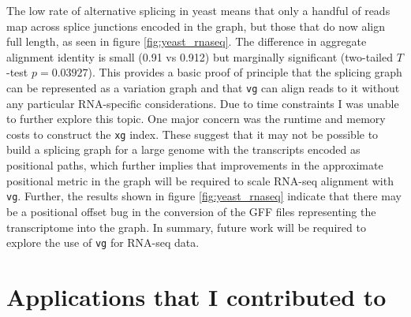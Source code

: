 The low rate of alternative splicing in yeast means that only a handful of reads map across splice junctions encoded in the graph, but those that do now align full length, as seen in figure \ref{fig:yeast_rnaseq}.
The difference in aggregate alignment identity is small (0.91 vs 0.912) but marginally significant (two-tailed $T$-test $p=0.03927$).
This provides a basic proof of principle that the splicing graph can be represented as a variation graph and that {\tt vg} can align reads to it without any particular RNA-specific considerations.
Due to time constraints I was unable to further explore this topic.
One major concern was the runtime and memory costs to construct the {\tt xg} index.
These suggest that it may not be possible to build a splicing graph for a large genome with the transcripts encoded as positional paths, which further implies that improvements in the approximate positional metric in the graph will be required to scale RNA-seq alignment with {\tt vg}.
Further, the results shown in figure \ref{fig:yeast_rnaseq} indicate that there may be a positional offset bug in the conversion of the GFF files representing the transcriptome into the graph.
In summary, future work will be required to explore the use of {\tt vg} for RNA-seq data.

\section{Applications that I contributed to}

